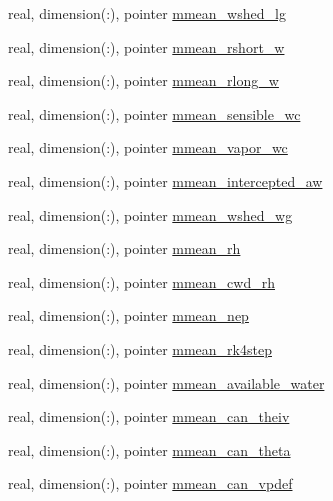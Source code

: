 \begin{DoxyCompactItemize}
\item 
real, dimension(\+:), pointer \hyperlink{structed__state__vars_1_1edtype_a2b8bac095323d2af7056bde5c3aa1cb1}{mmean\+\_\+wshed\+\_\+lg}
\item 
real, dimension(\+:), pointer \hyperlink{structed__state__vars_1_1edtype_a492246b2c17eff0a9da8074a544125ff}{mmean\+\_\+rshort\+\_\+w}
\item 
real, dimension(\+:), pointer \hyperlink{structed__state__vars_1_1edtype_a23470b6c5b7a60f83a8fc6e56bd5550b}{mmean\+\_\+rlong\+\_\+w}
\item 
real, dimension(\+:), pointer \hyperlink{structed__state__vars_1_1edtype_a66ac67f50eeae0dcc2002bb646c7d955}{mmean\+\_\+sensible\+\_\+wc}
\item 
real, dimension(\+:), pointer \hyperlink{structed__state__vars_1_1edtype_a2d0d7b8d90a06d90631cd9dfd59786ab}{mmean\+\_\+vapor\+\_\+wc}
\item 
real, dimension(\+:), pointer \hyperlink{structed__state__vars_1_1edtype_a993b877f194ffef872ef678f5ff50b96}{mmean\+\_\+intercepted\+\_\+aw}
\item 
real, dimension(\+:), pointer \hyperlink{structed__state__vars_1_1edtype_ac8ec650f92e824da438c22cb809f0b00}{mmean\+\_\+wshed\+\_\+wg}
\item 
real, dimension(\+:), pointer \hyperlink{structed__state__vars_1_1edtype_a9f8412f707d8838bb456a8aec1d96fb6}{mmean\+\_\+rh}
\item 
real, dimension(\+:), pointer \hyperlink{structed__state__vars_1_1edtype_a3ef34f92c191d30b6b99bc27d74218f5}{mmean\+\_\+cwd\+\_\+rh}
\item 
real, dimension(\+:), pointer \hyperlink{structed__state__vars_1_1edtype_aef7dbb51c8fb694d0da7bab813e04a12}{mmean\+\_\+nep}
\item 
real, dimension(\+:), pointer \hyperlink{structed__state__vars_1_1edtype_a27f6a4e17fdebead278d73575c251547}{mmean\+\_\+rk4step}
\item 
real, dimension(\+:), pointer \hyperlink{structed__state__vars_1_1edtype_ab56c84b2925054b6446b54beb61733e4}{mmean\+\_\+available\+\_\+water}
\item 
real, dimension(\+:), pointer \hyperlink{structed__state__vars_1_1edtype_af42711aa8cc133e038f82a5cbf1337a2}{mmean\+\_\+can\+\_\+theiv}
\item 
real, dimension(\+:), pointer \hyperlink{structed__state__vars_1_1edtype_aa5655655fbed54dcfe8b65e6523b68c3}{mmean\+\_\+can\+\_\+theta}
\item 
real, dimension(\+:), pointer \hyperlink{structed__state__vars_1_1edtype_a79daa251373869b74bc78d23c303d945}{mmean\+\_\+can\+\_\+vpdef}

\end{DoxyCompactItemize}
